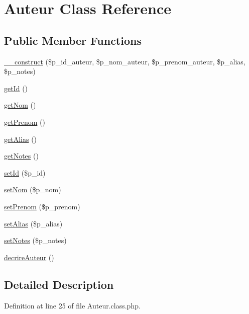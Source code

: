 \hypertarget{class_auteur}{}\section{Auteur Class Reference}
\label{class_auteur}
\subsection*{Public Member Functions}
\begin{DoxyCompactItemize}
\item 
\hyperlink{class_auteur_a64e72637d627d503760707d6638860d3}{\+\_\+\+\_\+construct} (\$p\+\_\+id\+\_\+auteur, \$p\+\_\+nom\+\_\+auteur, \$p\+\_\+prenom\+\_\+auteur, \$p\+\_\+alias, \$p\+\_\+notes)
\item 
\hyperlink{class_auteur_a12251d0c022e9e21c137a105ff683f13}{get\+Id} ()
\item 
\hyperlink{class_auteur_a184f2299ee4553fa0782ea87c9aed362}{get\+Nom} ()
\item 
\hyperlink{class_auteur_a2a243ff78ccebcd417fd644325f44701}{get\+Prenom} ()
\item 
\hyperlink{class_auteur_a26e3e0c627051b4287204b3575b81d97}{get\+Alias} ()
\item 
\hyperlink{class_auteur_ae5d103a1f6ef01da2567380016c726c8}{get\+Notes} ()
\item 
\hyperlink{class_auteur_ab2fff0fc655f96b6e5f4fcc294c49eee}{set\+Id} (\$p\+\_\+id)
\item 
\hyperlink{class_auteur_a64e05abe01ecd950dda832ceb8ad95a9}{set\+Nom} (\$p\+\_\+nom)
\item 
\hyperlink{class_auteur_a7bf9e7d18fd0cf6e38ffba353a5ad180}{set\+Prenom} (\$p\+\_\+prenom)
\item 
\hyperlink{class_auteur_aba4651b9d142badba3890fbca4fefbdf}{set\+Alias} (\$p\+\_\+alias)
\item 
\hyperlink{class_auteur_ad24f8871d4dd1bf2c5d219fb09247758}{set\+Notes} (\$p\+\_\+notes)
\item 
\hyperlink{class_auteur_a2526419428708f513a6e99dbc9d0653a}{decrire\+Auteur} ()
\end{DoxyCompactItemize}


\subsection{Detailed Description}


Definition at line 25 of file Auteur.\+class.\+php.



